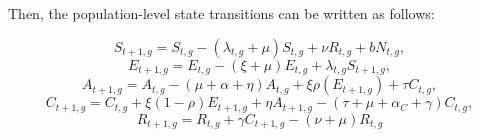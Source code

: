 \documentclass[fleqn]{article}
\begin{document}
Then, the population-level state transitions can be written as follows:

\[S_{t+1,g} = S_{t,g}-(\lambda_{t,g}+\mu)S_{t,g}+\nu R_{t,g}+bN_{t,g},\]
\[E_{t+1,g} = E_{t,g}-(\xi+\mu)E_{t,g}+\lambda_{t,g}S_{t+1,g},\]
\[A_{t+1,g} = A_{t,g}-(\mu+\alpha+\eta)A_{t,g}+\xi\rho(E_{t+1,g})+\tau C_{t,g},\]
\[C_{t+1,g} = C_{t,g}+\xi(1-\rho)E_{t+1,g}+\eta A_{t+1,g} - (\tau+\mu+\alpha_{C}+\gamma)C_{t,g},\]
\[R_{t+1,g} = R_{t,g} + \gamma C_{t+1,g} - (\nu +\mu)R_{t,g}\]
\end{document}
